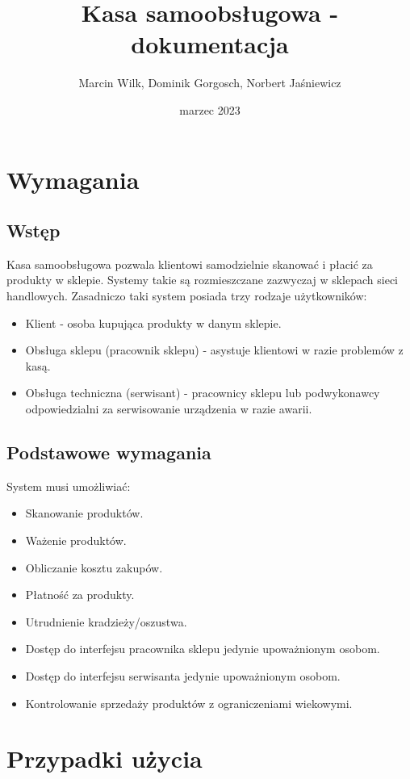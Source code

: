 \documentclass{article}
\title{Kasa samoobsługowa - dokumentacja}
\author{Marcin Wilk, Dominik Gorgosch, Norbert Jaśniewicz}
\date{marzec 2023}
\begin{document}
\maketitle
\tableofcontents
\newpage

\section{Wymagania}
    \subsection{Wstęp}
         Kasa samoobsługowa pozwala klientowi samodzielnie skanować i płacić za produkty w sklepie. Systemy takie są rozmieszczane zazwyczaj w sklepach sieci handlowych. Zasadniczo taki system posiada trzy rodzaje użytkowników:
            \begin{itemize}
                \item Klient - osoba kupująca produkty w danym sklepie.
                \item Obsługa sklepu (pracownik sklepu) - asystuje klientowi w razie problemów z kasą.
                \item Obsługa techniczna (serwisant) - pracownicy sklepu lub podwykonawcy odpowiedzialni za serwisowanie urządzenia w razie awarii.
            \end{itemize}
    \subsection{Podstawowe wymagania}
    System musi umożliwiać:
    \begin{itemize}
        \item Skanowanie produktów.
        \item Ważenie produktów.
        \item Obliczanie kosztu zakupów.
        \item Płatność za produkty.
        \item Utrudnienie kradzieży/oszustwa.
        \item Dostęp do interfejsu pracownika sklepu jedynie upoważnionym osobom.
        \item Dostęp do interfejsu serwisanta jedynie upoważnionym osobom.
        \item Kontrolowanie sprzedaży produktów z ograniczeniami wiekowymi.
    \end{itemize}
\section{Przypadki użycia}
\begin{center}
\end{center}
\end{document}
